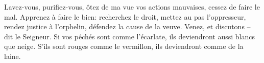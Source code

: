 Lavez-vous, purifiez-vous,
	ôtez de ma vue vos actions mauvaises, cessez de faire le mal.
Apprenez à faire le bien:
	recherchez le droit, mettez au pas l’oppresseur,
	rendez justice à l’orphelin, défendez la cause de la veuve.
Venez, et discutons – dit le Seigneur.
Si vos péchés sont comme l’écarlate, ils deviendront aussi blancs que neige.
	S’ils sont rouges comme le vermillon, ils deviendront comme de la laine.
